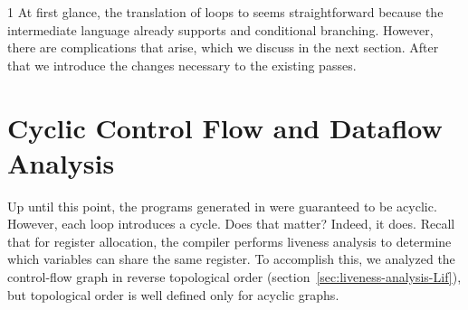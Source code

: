 \documentclass[7x10]{TimesAPriori_MIT}%
\def\pythonEd{1}
\def\edition{1}
\newcommand{\pythonColor}[0]{}
\numberwithin{theorem}{chapter}
\numberwithin{definition}{chapter}
\numberwithin{equation}{chapter}
\begin{document}
{\if\edition\pythonEd\pythonColor
%
At first glance, the translation of  loops to \ArchName{} seems
straightforward because the \LangCIf{} intermediate language already
supports  and conditional branching. However, there are
complications that arise, which we discuss in the next section. After
that we introduce the changes necessary to the existing passes.
%
\fi}

\section{Cyclic Control Flow and Dataflow Analysis}
\label{sec:dataflow-analysis}

Up until this point, the programs generated in
 were guaranteed to be acyclic. However, each
 loop introduces a cycle. Does that matter?
%
Indeed, it does.  Recall that for register allocation, the compiler
performs liveness analysis to determine which variables can share the
same register.  To accomplish this, we analyzed the control-flow graph
in reverse topological order
(section~\ref{sec:liveness-analysis-Lif}), but topological order is
well defined only for acyclic graphs.
\end{document}
